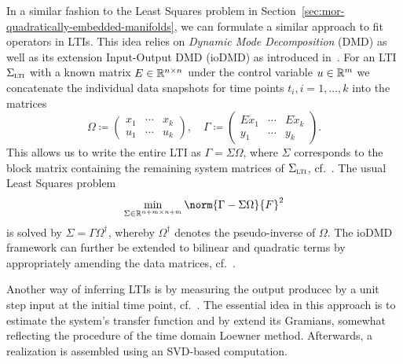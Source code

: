 In a similar fashion to the Least Squares problem in Section~\ref{sec:mor-quadratically-embedded-manifolds}, we can formulate a similar approach to fit operators in \acp{LTI}.
This idea relies on \emph{Dynamic Mode Decomposition} (DMD) as well as its extension Input-Output DMD (ioDMD) as introduced in~\cite{Annoni2016}.
For an \ac{LTI} $\Sigma_{\textnormal{\scshape lti}}$ with a known matrix $E \in \mathbb{R}^{n \times n}$ under the control variable $u \in \mathbb{R}^m$ we concatenate the individual data snapshots for time points $t_i, i = 1, \dots, k$ into the matrices
\begin{equation}\label{eq:iodmd-data-matrices}
    \Omega \coloneqq \begin{pmatrix}
        x_1 & \cdots & x_k \\
        u_1 & \cdots & u_k
    \end{pmatrix},\quad \Gamma \coloneqq \begin{pmatrix}
        E \dot{x}_1 & \cdots & E \dot{x}_k \\
        y_1 & \cdots & y_k
    \end{pmatrix}.
\end{equation}
This allows us to write the entire \ac{LTI} as $\Gamma = \Sigma \Omega$, where $\Sigma$ corresponds to the block matrix containing the remaining system matrices of $\Sigma_{\textnormal{\scshape lti}}$, cf.~\cite{Heiland2022}.
The usual Least Squares problem
\begin{equation*}
    \min\limits_{\Sigma \in \bb{R}^{n + m \times n + m}} \norm{\Gamma - \Sigma \Omega}{F}^2
\end{equation*}
is solved by $\Sigma = \Gamma \Omega^\dagger$, whereby $\Omega^\dagger$ denotes the pseudo-inverse of $\Omega$.
The ioDMD framework can further be extended to bilinear and quadratic terms by appropriately amending the data matrices, cf.~\cite{Gosea2021}.


Another way of inferring \acp{LTI} is by measuring the output producec by a unit step input at the initial time point, cf.~\cite{Miller2012}.
The essential idea in this approach is to estimate the system's transfer function and by extend its Gramians, somewhat reflecting the procedure of the time domain Loewner method.
Afterwards, a realization is assembled using an SVD-based computation.

